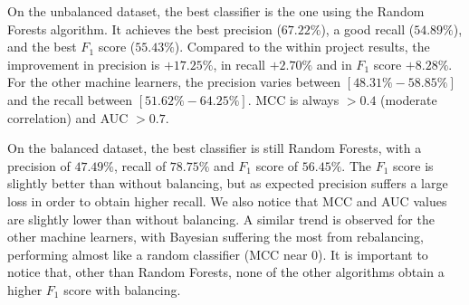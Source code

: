 On the unbalanced dataset, the best classifier is the one using the Random Forests algorithm. It achieves the best precision ($67.22\%$), a good recall ($54.89\%$), and the best $F_{1}$ score ($55.43\%$). Compared to the within project results, the improvement in precision is $+17.25\%$, in recall $+2.70\%$ and in $F_1$ score $+8.28\%$. For the other machine learners, the precision varies between $[48.31\%-58.85\%]$ and the recall between $[51.62\%-64.25\%]$. MCC is always $>0.4$ (moderate correlation) and AUC $>0.7$.

On the balanced dataset, the best classifier is still Random Forests, with a precision of $47.49\%$, recall of $78.75\%$ and $F_{1}$ score of $56.45\%$. The $F_{1}$ score is slightly better than without balancing, but as expected precision suffers a large loss in order to obtain higher recall. We also notice that MCC and AUC values are slightly lower than without balancing. A similar trend is observed for the other machine learners, with Bayesian suffering the most from rebalancing, performing almost like a random classifier (MCC near $0$). It is important to notice that, other than Random Forests, none of the other algorithms obtain a higher $F_1$ score with balancing.

